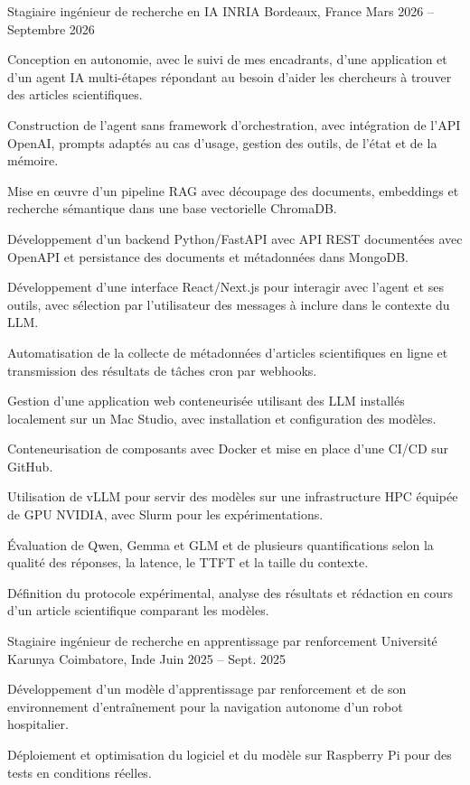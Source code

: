 
\begin{cventries}
  \cventry
    {Stagiaire ingénieur de recherche en IA}
    {INRIA}
    {Bordeaux, France}
    {Mars 2026 -- Septembre 2026}
    {
      \begin{cvitems}
        \item {Conception en autonomie, avec le suivi de mes encadrants, d’une application et d’un agent IA multi-étapes répondant au besoin d’aider les chercheurs à trouver des articles scientifiques.}
        \item {Construction de l’agent sans framework d’orchestration, avec intégration de l’API OpenAI, prompts adaptés au cas d’usage, gestion des outils, de l’état et de la mémoire.}
        \item {Mise en œuvre d’un pipeline RAG avec découpage des documents, embeddings et recherche sémantique dans une base vectorielle ChromaDB.}
        \item {Développement d’un backend Python/FastAPI avec API REST documentées avec OpenAPI et persistance des documents et métadonnées dans MongoDB.}
        \item {Développement d’une interface React/Next.js pour interagir avec l’agent et ses outils, avec sélection par l’utilisateur des messages à inclure dans le contexte du LLM.}
        \item {Automatisation de la collecte de métadonnées d’articles scientifiques en ligne et transmission des résultats de tâches cron par webhooks.}
        \item {Gestion d’une application web conteneurisée utilisant des LLM installés localement sur un Mac Studio, avec installation et configuration des modèles.}
        \item {Conteneurisation de composants avec Docker et mise en place d’une CI/CD sur GitHub.}
        \item {Utilisation de vLLM pour servir des modèles sur une infrastructure HPC équipée de GPU NVIDIA, avec Slurm pour les expérimentations.}
        \item {Évaluation de Qwen, Gemma et GLM et de plusieurs quantifications selon la qualité des réponses, la latence, le TTFT et la taille du contexte.}
        \item {Définition du protocole expérimental, analyse des résultats et rédaction en cours d’un article scientifique comparant les modèles.}
      \end{cvitems}
    }

  \cventry
    {Stagiaire ingénieur de recherche en apprentissage par renforcement}
    {Université Karunya}
    {Coimbatore, Inde}
    {Juin 2025 -- Sept. 2025}
    {
      \begin{cvitems}
        \item {Développement d’un modèle d’apprentissage par renforcement et de son environnement d’entraînement pour la navigation autonome d’un robot hospitalier.}
        \item {Déploiement et optimisation du logiciel et du modèle sur Raspberry Pi pour des tests en conditions réelles.}
      \end{cvitems}
    }
\end{cventries}
